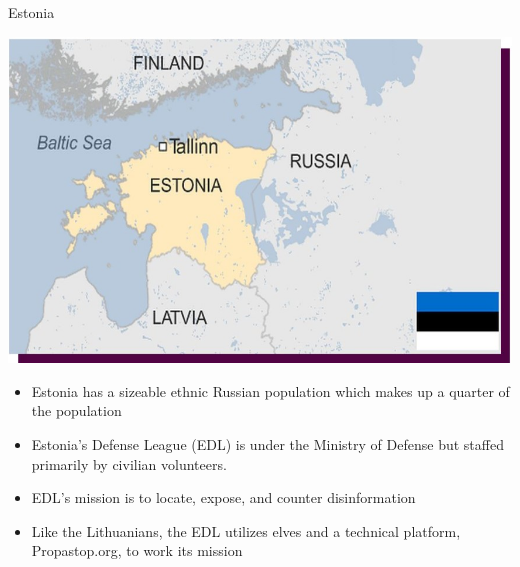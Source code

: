 \documentclass[nobackground,dvipsnames,table]{beamer}
\begin{document}
\begin{frame}{Estonia}
\begin{minipage}{\textwidth}
    \centering \includegraphics[scale=.35]{img/fig18.jpg}
\end{minipage}

\begin{minipage}{\textwidth}
    \footnotesize{
    \begin{itemize}
        \item Estonia has a sizeable ethnic Russian population which makes up a quarter of the population
        \item Estonia’s Defense League (EDL) is under the Ministry of Defense but staffed primarily by civilian volunteers. 
        \item EDL’s mission is to locate, expose, and counter disinformation
        \item Like the Lithuanians, the EDL utilizes elves and a technical platform, Propastop.org, to work its mission
    \end{itemize}
    }
\end{minipage}

\end{frame}
\end{document}
